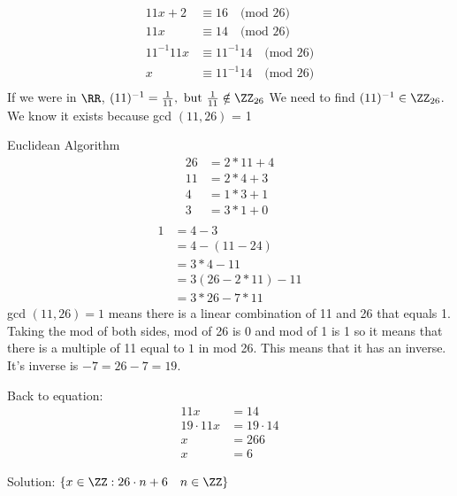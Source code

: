 \documentclass[11pt]{scrartcl}
\begin{document}
\begin{example}
  \begin{align*}
    11x + 2 & \equiv 16 \quad \text{(mod 26)} \\
    11x & \equiv 14 \quad \text{(mod 26)} \\
    11^{-1}11x & \equiv 11^{-1}14 \quad \text{(mod 26)} \\
    x & \equiv 11^{-1}14 \quad \text{(mod 26)} \\
  \end{align*}
  If we were in $\RR$, $(11)^{-1} = \frac{1}{11}, \ \text{but} \ \frac{1}{11} \notin \ZZ_{26}$ 
  We need to find $(11)^{-1} \in \ZZ_{26}$. We know it exists because  gcd $(11, 26)$ = 1

  Euclidean Algorithm
  \begin{align*}
    26 & = 2 * 11 + 4 \\
    11 & = 2 * 4 + 3 \\
    4 & = 1 * 3 + 1 \\
    3 & = 3 * 1 + 0 \\
  \end{align*}
  \begin{align*}
    1 & = 4 - 3 \\
      & = 4 - (11 - 24) \\
      & = 3 * 4 - 11 \\
      & = 3 (26 - 2 * 11) - 11 \\
      & = 3 * 26 - 7 * 11 
  \end{align*}
  gcd $(11, 26) = 1$  means there is a linear combination of 11 and 26 that equals 1. Taking the mod of both sides, mod of 26 is 0 and mod of 1 is 1 so it means that there is a multiple of 11 equal to $1$ in mod 26. This means that it has an inverse. It's inverse is $-7 = 26 - 7 = 19$.

  Back to equation:
  \begin{align*}
    11x & = 14 \\
    19 \cdot 11x & = 19 \cdot 14 \\
    x & = 266 \\
    x & = 6
  \end{align*}

  Solution:
  $\{x \in \ZZ: 26 \cdot n + 6 \quad n \in \ZZ\}$

\end{example}
\end{document}
